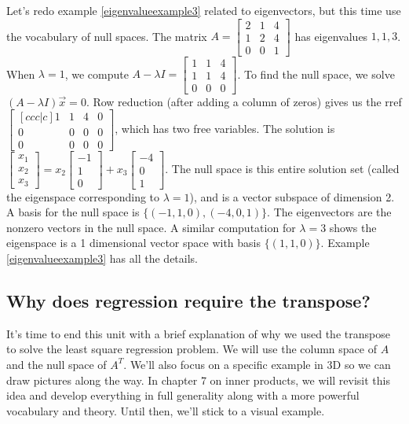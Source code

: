 \begin{example}
Let's redo example \ref{eigenvalueexample3} related to eigenvectors, but this time use the vocabulary of null spaces.  
The matrix 
$A=\begin{bmatrix}2&1&4\\ 1&2&4\\ 0&0&1\end{bmatrix}$ has eigenvalues $1,1,3$. 
When $\lambda=1$, we compute $A-\lambda I =\begin{bmatrix}1&1&4\\ 1&1&4\\ 0&0&0\end{bmatrix} $. To find the null space, we solve $(A-\lambda I )\vec x=0$. Row reduction (after adding a column of zeros) gives us the rref $\begin{bmatrix}[ccc|c]1&1&4&0\\ 0&0&0&0\\ 0&0&0&0\end{bmatrix}$, which has two free variables. The solution is $\begin{bmatrix} x_1\\x_2\\ x_3\end{bmatrix} = x_2\begin{bmatrix} -1\\1\\0\end{bmatrix}+x_3\begin{bmatrix} -4\\0\\1\end{bmatrix} $. The null space is this entire solution set (called the eigenspace corresponding to $\lambda = 1$), and is a vector subspace of dimension 2. A basis for the null space is $\{(-1,1,0),(-4,0,1)\}$.  
The eigenvectors are the nonzero vectors in the null space.  A similar computation for $\lambda = 3$ shows the eigenspace is a 1 dimensional vector space with basis $\{(1,1,0)\}$. Example \ref{eigenvalueexample3} has all the details.

\end{example}



\subsection{Why does regression require the transpose?}
It's time to end this unit with a brief explanation of why we used the transpose to solve the least square regression problem.  We will use the column space of $A$ and the null space of $A^T$. We'll also focus on a specific example in 3D so we can draw pictures along the way.  In chapter 7 on inner products, we will revisit this idea and develop everything in full generality along with a more powerful vocabulary and theory.  Until then, we'll stick to a visual example.

